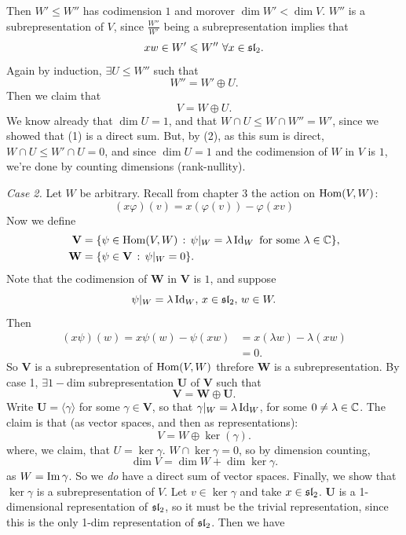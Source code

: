 \documentclass{article}
\begin{document}
\begin{enumerate}
    Then $W' \leq W''$ has codimension $1$ and morover $\dim W' < \dim V$. $W''$ is a subrepresentation of $V$, since $\frac{W''}{W'}$ being a subrepresentation implies that \[ xw \in W' \leqslant W'' \, \, \forall x \in \mathfrak{sl}_{2}.\] Again by induction, $\exists U \leq W''$ such that \[ W'' = W' \oplus U. \tag{2} \] Then we claim that \[V = W \oplus U. \] We know already that $\dim U = 1$, and that $W \cap U \leq W \cap W'' = W'$, since we showed that (1) is a direct sum. But, by (2), as this sum is direct, $W \cap U \leq W' \cap U = 0$, and since $\dim U = 1$ and the codimension of $W$ in $V$ is $1$, we're done by counting dimensions (rank-nullity).
\end{enumerate}
\textit{Case 2.} Let $W$ be arbitrary. Recall from chapter $3$ the action on $\operatorname{Hom}(V,W)$: \[ (x \varphi)(v) = x(\varphi(v)) - \varphi(xv) \tag{3.3(6)}\]
Now we define \begin{align*}
    \mathbf{V} &= \{ \psi \in \operatorname{Hom}(V,W) \, : \, \psi |_{W} = \lambda \operatorname{Id}_{W} \text{ for some } \lambda \in \mathbb{C}\},\\
    \mathbf{W} &= \{ \psi \in \mathbf{V} \, : \, \psi |_{W} = 0 \}.
\end{align*}
    Note that the codimension of $\mathbf{W}$ in $\mathbf{V}$ is $1$, and suppose \[\psi |_{W} = \lambda \operatorname{Id}_{W}, \, x \in \mathfrak{sl}_{2}, \, w \in W.\] Then \begin{align*} 
    (x\psi)(w) = x \psi(w) - \psi(xw) &= x(\lambda w) - \lambda (xw) \\
    &= 0.
\end{align*}
So $\mathbf{V}$ is a subrepresentation of $\operatorname{Hom}(V,W)$ threfore $\mathbf{W}$ is a subrepresentation. By case 1, $\exists 1-$dim subrepresentation $\mathbf{U}$ of $\mathbf{V}$ such that \[ \mathbf{V} = \mathbf{W} \oplus \mathbf{U}.\] Write $\mathbf{U} = \langle \gamma \rangle$ for some $\gamma \in \mathbf{V}$, so that $\gamma|_{W} = \lambda \operatorname{Id}_{W}$, for some $0 \neq \lambda \in \mathbb{C}$. The claim is that (as vector spaces, and then as representations): \[ V = W \oplus \ker(\gamma).
\] where, we claim, that $U = \ker \gamma$.
\newlec
$W \cap \ker \gamma=0$, so by dimension counting, \[ \dim V = \dim W + \dim \ker \gamma.\] as $W= \operatorname{Im} \gamma$. So we \textit{do} have a direct sum of vector spaces. Finally, we show that $\ker \gamma$ is a subrepresentation of $V$. Let $v \in \ker \gamma$ and take $x \in \mathfrak{sl}_{2}$. $\mathbf{U}$ is a 1-dimensional representation of $\mathfrak{sl}_{2}$, so it must be the trivial representation, since this is the only 1-dim representation of $\mathfrak{sl}_{2}$.
Then we have 
\end{document}
